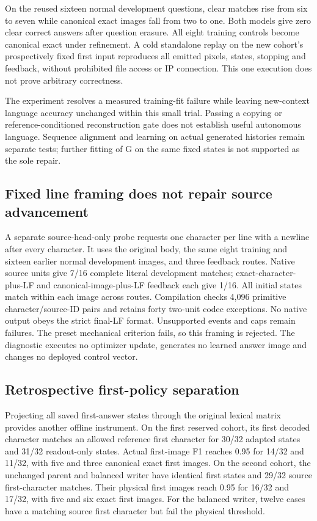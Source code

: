 \documentclass[10pt,a4paper]{article}
\providecommand{\DIFadd}[1]{{\protect\color{blue} \sf #1}} %
\begin{document}
\DIFadd{On the reused sixteen normal development questions, clear matches rise from
six to seven while canonical exact images fall from two to one. Both models
give zero clear correct answers after question erasure. All eight training
controls become canonical exact under refinement. A cold standalone replay on
the new cohort's prospectively fixed first input reproduces all emitted pixels,
states, stopping and feedback, without prohibited file access or IP connection.
This one execution does not prove arbitrary correctness.
}

\DIFadd{The experiment resolves a measured training-fit failure while leaving
new-context language accuracy unchanged within this small trial. Passing a
copying or reference-conditioned reconstruction gate does not establish useful
autonomous language. Sequence alignment and learning on actual generated
histories remain separate tests; further fitting of G on the same fixed states
is not supported as the sole repair.
}

\subsection*{\DIFadd{Fixed line framing does not repair source advancement}}
\DIFadd{A separate source-head-only probe requests one character per line with a
newline after every character. It uses the original body, the same eight
training and sixteen earlier normal development images, and three feedback
routes. Native source units give 7/16 complete literal development matches;
exact-character-plus-LF and canonical-image-plus-LF feedback each give 1/16.
All initial states match within each image across routes. Compilation checks
4,096 primitive character/source-ID pairs and retains forty two-unit codec
exceptions. No native output obeys the strict final-LF format. Unsupported
events and caps remain failures. The preset mechanical criterion fails, so
this framing is rejected. The diagnostic executes no optimizer update,
generates no learned answer image and changes no deployed control vector.
}

\subsection*{\DIFadd{Retrospective first-policy separation}}
\DIFadd{Projecting all saved first-answer states through the original lexical matrix
provides another offline instrument. On the first reserved cohort, its first
decoded character matches an allowed reference first character for 30/32
adapted states and 31/32 readout-only states. Actual first-image F1 reaches
0.95 for 14/32 and 11/32, with five and three canonical exact first images.
On the second cohort, the unchanged parent and balanced writer have identical
first states and 29/32 source first-character matches. Their physical first
images reach 0.95 for 16/32 and 17/32, with five and six exact first images.
For the balanced writer, twelve cases have a matching source first character
but fail the physical threshold.
}
\end{document}
